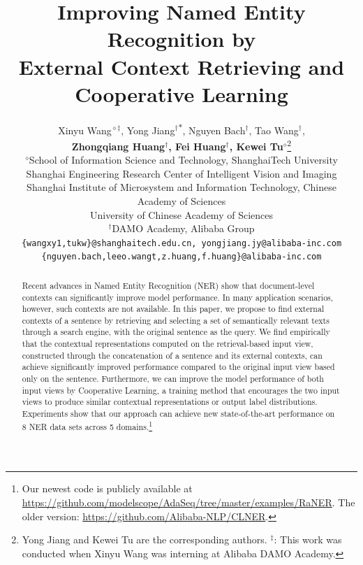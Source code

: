 \documentclass[11pt,a4paper]{article}
\title{Improving Named Entity Recognition by \\ External Context Retrieving and Cooperative Learning}
\author{Xinyu Wang$^{\diamond\ddagger}$, Yong Jiang$^{\dagger}$\textsuperscript{$\ast$}, Nguyen Bach$^{\dagger}$, Tao Wang$^{\dagger}$,\\
\textbf{Zhongqiang Huang$^{\dagger}$, Fei Huang$^{\dagger}$,  Kewei Tu$^{\diamond}$}\thanks{\hspace{1mm} Yong Jiang and Kewei Tu are the corresponding authors. $^{\ddagger}$: This work was conducted when Xinyu Wang was interning at Alibaba DAMO Academy. } \\
 $^\diamond$School of Information Science and Technology, ShanghaiTech University \\
 Shanghai Engineering Research Center of Intelligent Vision and Imaging \\
 Shanghai Institute of Microsystem and Information Technology, Chinese Academy of Sciences \\
 University of Chinese Academy of Sciences \\
 $^\dagger$DAMO Academy, Alibaba Group \\
  {\tt \{wangxy1,tukw\}@shanghaitech.edu.cn, yongjiang.jy@alibaba-inc.com} \\
  {\tt \{nguyen.bach,leeo.wangt,z.huang,f.huang\}@alibaba-inc.com} \\
}
\date{}
\begin{document}
\maketitle
\begin{abstract}

Recent advances in Named Entity Recognition (NER) show that document-level contexts can significantly improve model performance. In many application scenarios, however, such contexts are not available. In this paper, we propose to find external contexts of a sentence by retrieving and selecting a set of semantically relevant texts through a search engine, with the original sentence as the query. We find empirically that the contextual representations computed on the retrieval-based input view, constructed through the concatenation of a sentence and its external contexts, can achieve significantly improved performance compared to the original input view based only on the sentence. Furthermore, we can improve the model performance of both input views by Cooperative Learning, a training method that encourages the two input views to produce similar contextual representations or output label distributions. Experiments show that our approach can achieve new state-of-the-art performance on 8 NER data sets across 5 domains.\footnote{Our newest code is publicly available at \url{https://github.com/modelscope/AdaSeq/tree/master/examples/RaNER}. The older version: \url{https://github.com/Alibaba-NLP/CLNER}.}

\end{abstract}
\end{document}
